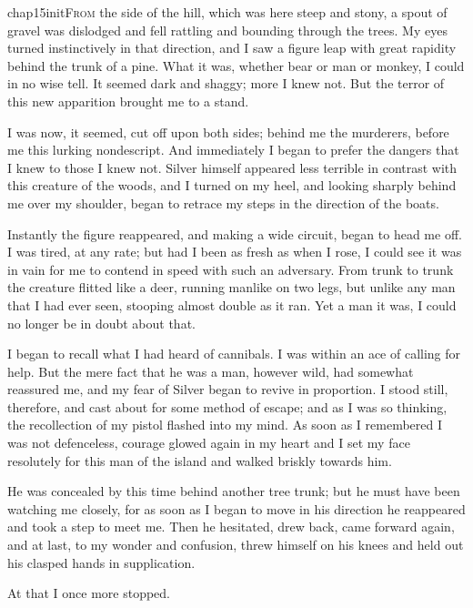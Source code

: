 
 \lettrine[lines=5,image=true,findent=2pt]{chap15initF}{rom} the side of the hill, which was here steep and stony, a spout of gravel was dislodged and fell rattling and bounding through the trees. My eyes turned instinctively in that direction, and I saw a figure leap with great rapidity behind the trunk of a pine. What it was, whether bear or man or monkey, I could in no wise tell. It seemed dark and shaggy; more I knew not. But the terror of this new apparition brought me to a stand.

I was now, it seemed, cut off upon both sides; behind me the murderers, before me this lurking nondescript. And immediately I began to prefer the dangers that I knew to those I knew not. Silver himself appeared less terrible in contrast with this creature of the woods, and I turned on my heel, and looking sharply behind me over my shoulder, began to retrace my steps in the direction of the boats.

Instantly the figure reappeared, and making a wide circuit, began to head me off. I was tired, at any rate; but had I been as fresh as when I rose, I could see it was in vain for me to contend in speed with such an adversary. From trunk to trunk the creature flitted like a deer, running manlike on two legs, but unlike any man that I had ever seen, stooping almost double as it ran. Yet a man it was, I could no longer be in doubt about that.

I began to recall what I had heard of cannibals. I was within an ace of calling for help. But the mere fact that he was a man, however wild, had somewhat reassured me, and my fear of Silver began to revive in proportion. I stood still, therefore, and cast about for some method of escape; and as I was so thinking, the recollection of my pistol flashed into my mind. As soon as I remembered I was not defenceless, courage glowed again in my heart and I set my face resolutely for this man of the island and walked briskly towards him.

He was concealed by this time behind another tree trunk; but he must have been watching me closely, for as soon as I began to move in his direction he reappeared and took a step to meet me. Then he hesitated, drew back, came forward again, and at last, to my wonder and confusion, threw himself on his knees and held out his clasped hands in supplication.

At that I once more stopped.

